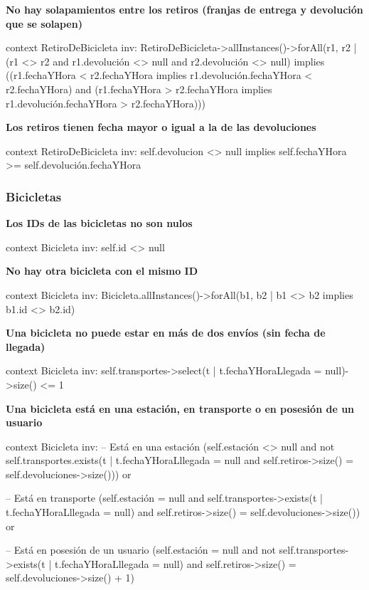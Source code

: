 \documentclass[a4paper, 10pt, twoside]{article}
\newenvironment{ocl}[1]
  {
    \textbf{#1}
    \verbatim
  }{
    \endverbatim
  }
\begin{document}
\begin{ocl}{No hay solapamientos entre los retiros (franjas de entrega y devolución que se solapen)}
  context RetiroDeBicicleta
  inv: RetiroDeBicicleta->allInstances()->forAll(r1, r2 |
           (r1 <> r2 and r1.devolución <> null and r2.devolución <> null) implies
               ((r1.fechaYHora < r2.fechaYHora implies
                   r1.devolución.fechaYHora < r2.fechaYHora) and
                (r1.fechaYHora > r2.fechaYHora implies
                   r1.devolución.fechaYHora > r2.fechaYHora)))
\end{ocl}

\begin{ocl}{Los retiros tienen fecha mayor o igual a la de las devoluciones}
  context RetiroDeBicicleta
  inv: self.devolucion <> null implies self.fechaYHora >= self.devolución.fechaYHora
\end{ocl}


\subsubsection{Bicicletas}

\begin{ocl}{Los IDs de las bicicletas no son nulos}
  context Bicicleta
  inv: self.id <> null
\end{ocl}

\begin{ocl}{No hay otra bicicleta con el mismo ID}
  context Bicicleta
  inv: Bicicleta.allInstances()->forAll(b1, b2 | b1 <> b2 implies b1.id <> b2.id)
\end{ocl}

\begin{ocl}{Una bicicleta no puede estar en más de dos envíos (sin fecha de llegada)}
  context Bicicleta
  inv: self.transportes->select(t | t.fechaYHoraLlegada = null)->size() <= 1
\end{ocl}

\begin{ocl}{Una bicicleta está en una estación, en transporte o en posesión de un usuario}
  context Bicicleta
  inv: -- Está en una estación
       (self.estación <> null and not self.transportes.exists(t |
           t.fechaYHoraLllegada = null and
           self.retiros->size() = self.devoluciones->size())) or

       -- Está en transporte
       (self.estación = null and
        self.transportes->exists(t | t.fechaYHoraLllegada = null) and
        self.retiros->size() = self.devoluciones->size()) or

       -- Está en posesión de un usuario
       (self.estación = null and
        not self.transportes->exists(t | t.fechaYHoraLllegada = null) and
        self.retiros->size() = self.devoluciones->size() + 1)
\end{ocl}
\end{document}
